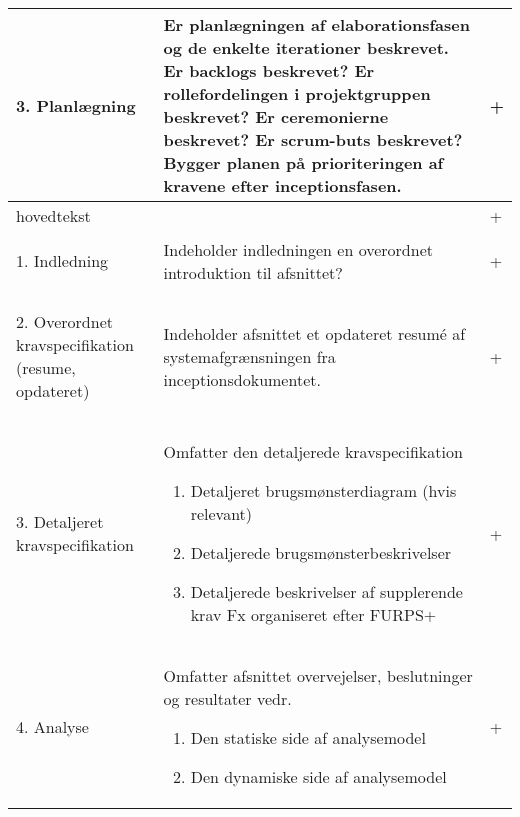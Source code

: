 \begin{center}
\begin{longtable}{|m{3.5cm}|m{10cm}|m{2.5cm}|}
\hline
\begin{flushright}
3. Planlægning
\end{flushright}
& Er planlægningen af elaborationsfasen og de enkelte iterationer beskrevet.\newline
Er backlogs beskrevet?\newline
Er rollefordelingen i projektgruppen beskrevet?\newline
Er ceremonierne beskrevet?\newline
Er scrum-buts beskrevet?\newline
Bygger planen på prioriteringen af kravene efter inceptionsfasen. & +\\
\hline
hovedtekst & & +\\ \hline
\begin{flushright}
1. Indledning
\end{flushright} & Indeholder indledningen en overordnet introduktion til afsnittet? & +\\ \hline
\begin{flushright}
2. Overordnet kravspecifikation (resume, opdateret)
\end{flushright} & Indeholder afsnittet et opdateret resumé  af systemafgrænsningen fra inceptionsdokumentet. & +\\ \hline
\begin{flushright}
3. Detaljeret kravspecifikation
\end{flushright} & 
Omfatter den detaljerede kravspecifikation \newline
\begin{enumerate}
\item Detaljeret brugsmønsterdiagram (hvis relevant)
\item Detaljerede brugsmønsterbeskrivelser 
\item Detaljerede beskrivelser af supplerende krav Fx organiseret efter FURPS+
\end{enumerate}
& +\\
\hline
\begin{flushright}
4. Analyse
\end{flushright}
& Omfatter afsnittet overvejelser, beslutninger og resultater vedr. \newline
\begin{enumerate}
\item Den statiske side af analysemodel
\item Den dynamiske side af analysemodel
\end{enumerate}
& +\\ \hline

\end{longtable}
\end{center}
